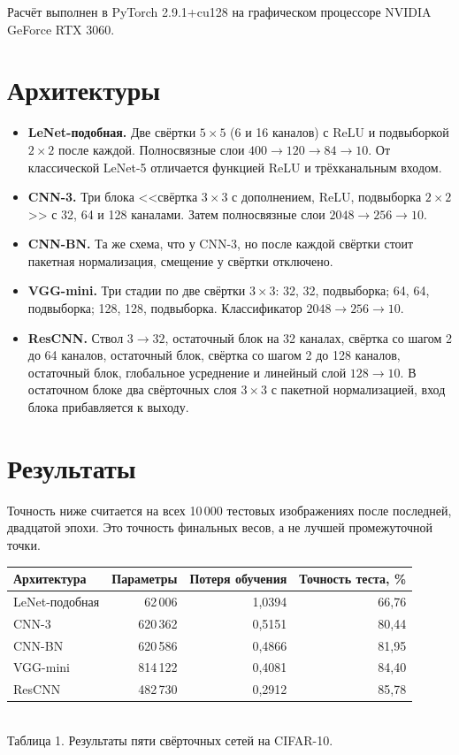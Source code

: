 \documentclass[12pt,a4paper]{article}
\begin{document}
Расчёт выполнен в PyTorch 2.9.1+cu128 на графическом процессоре NVIDIA GeForce RTX 3060.

\section{Архитектуры}
\begin{itemize}
\item \textbf{LeNet-подобная.} Две свёртки $5\times5$ (6 и 16 каналов) с ReLU и подвыборкой $2\times2$ после каждой. Полносвязные слои $400 \to 120 \to 84 \to 10$. От классической LeNet-5 отличается функцией ReLU и трёхканальным входом.
\item \textbf{CNN-3.} Три блока <<свёртка $3\times3$ с дополнением, ReLU, подвыборка $2\times2$>> с 32, 64 и 128 каналами. Затем полносвязные слои $2048 \to 256 \to 10$.
\item \textbf{CNN-BN.} Та же схема, что у CNN-3, но после каждой свёртки стоит пакетная нормализация, смещение у свёртки отключено.
\item \textbf{VGG-mini.} Три стадии по две свёртки $3\times3$: 32, 32, подвыборка; 64, 64, подвыборка; 128, 128, подвыборка. Классификатор $2048 \to 256 \to 10$.
\item \textbf{ResCNN.} Ствол $3\to32$, остаточный блок на 32 каналах, свёртка со шагом 2 до 64 каналов, остаточный блок, свёртка со шагом 2 до 128 каналов, остаточный блок, глобальное усреднение и линейный слой $128 \to 10$. В остаточном блоке два свёрточных слоя $3\times3$ с пакетной нормализацией, вход блока прибавляется к выходу.
\end{itemize}

\section{Результаты}

Точность ниже считается на всех 10\,000 тестовых изображениях после последней, двадцатой эпохи. Это точность финальных весов, а не лучшей промежуточной точки.

\begin{center}
\begin{tabular}{lrrr}
\toprule
Архитектура & Параметры & Потеря обучения & Точность теста, \% \\
\midrule
LeNet-подобная & 62\,006 & 1{,}0394 & 66{,}76 \\
CNN-3 & 620\,362 & 0{,}5151 & 80{,}44 \\
CNN-BN & 620\,586 & 0{,}4866 & 81{,}95 \\
VGG-mini & 814\,122 & 0{,}4081 & 84{,}40 \\
ResCNN & 482\,730 & 0{,}2912 & 85{,}78 \\
\bottomrule
\end{tabular}\\[0.4em]
{\small Таблица 1. Результаты пяти свёрточных сетей на CIFAR-10.}
\end{center}
\end{document}
